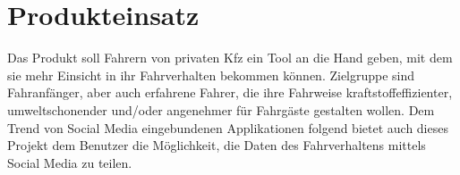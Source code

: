 \chapter{Produkteinsatz}
Das Produkt soll Fahrern von privaten Kfz ein Tool an die Hand geben, mit dem sie mehr Einsicht in ihr Fahrverhalten bekommen können. Zielgruppe sind Fahranfänger, aber auch erfahrene Fahrer, die ihre Fahrweise kraftstoffeffizienter, umweltschonender und/oder angenehmer für Fahrgäste gestalten wollen. Dem Trend von Social Media eingebundenen Applikationen folgend bietet auch dieses Projekt dem Benutzer die Möglichkeit, die Daten des Fahrverhaltens mittels Social Media zu teilen.